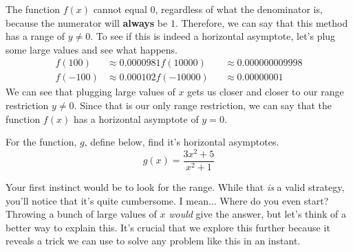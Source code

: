 \begin{solution}
    The function $f(x)$ cannot equal $0$, regardless of what the denominator is, because the numerator will \textbf{always} be $1$. Therefore, we can say that this method has a range of $y \neq 0$. To see if this is indeed a horizontal asymptote, let's plug some large values and see what happens.
    \[
    \begin{aligned}
        f(100) &\approx 0.0000981
        f(10000) &&\approx 0.000000009998 \\
        f(-100) &\approx 0.000102
        f(-10000) &&\approx 0.00000001
    \end{aligned}
    \]
    We can see that plugging large values of $x$ gets us closer and closer to our range restriction $y \neq 0$. Since that is our only range restriction, we can say that the function $f(x)$ has a horizontal asymptote of $y = 0$.

    \begin{center}
    \end{center}
\end{solution}

\begin{problem}
    For the function, $g$, define below, find it's horizontal asymptotes.
    \[
        g(x) = \frac{3x^2 + 5}{x^2 + 1}
    \]
\end{problem}

Your first instinct would be to look for the range. While that \textit{is} a valid strategy, you'll notice that it's quite cumbersome. I mean... Where do you even start? Throwing a bunch of large values of $x$ \textit{would} give the answer, but let's think of a better way to explain this. It's crucial that we explore this further because it reveals a trick we can use to solve any problem like this in an instant.

